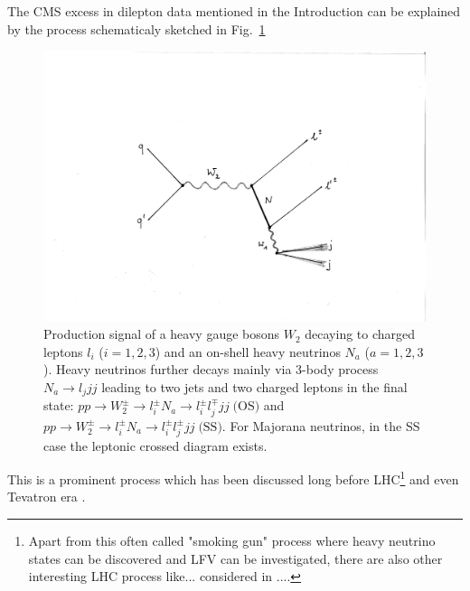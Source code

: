 \documentclass[twocolumn,superscriptaddress,showpacs,prl,nofootinbib,floatfix]{revtex4}
\begin{document}
The CMS excess in dilepton data mentioned in the Introduction can be explained by the process 
schematicaly sketched in Fig.~\ref{lljj}
\begin{figure}[h!]
\begin{center}
\includegraphics[scale=0.5]{pp_WR}
\caption{ 
Production signal of a heavy gauge bosons $W_2$ decaying to charged leptons $l_i$ ($i=1,2,3$) and an on-shell heavy neutrinos $N_a$ ($a=1,2,3$).
Heavy neutrinos further decays mainly  via 3-body process $N_a\to l_jjj$ leading to two jets and two charged leptons in the final state:
$pp\to W_2^{\pm}\to l_i^{\pm} N_a\to l_i^{\pm} l_j^{\mp}jj\; \textrm{(OS)}$
and 
$pp\to W_2^{\pm}\to l_i^{\pm} N_a\to l_i^{\pm} l_j^{\pm}jj\; \textrm{(SS)}$.
For Majorana neutrinos, in the SS case the leptonic crossed diagram exists.
}\label{lljj}
\end{center}
\end{figure}
This is a prominent process which has been discussed long before LHC\footnote{
Apart from this often called "smoking gun" process where heavy neutrino states can be discovered and LFV can be investigated, there are also other interesting LHC process like... considered in ....} and even Tevatron era \cite{Keung:1983uu}.
\end{document}
